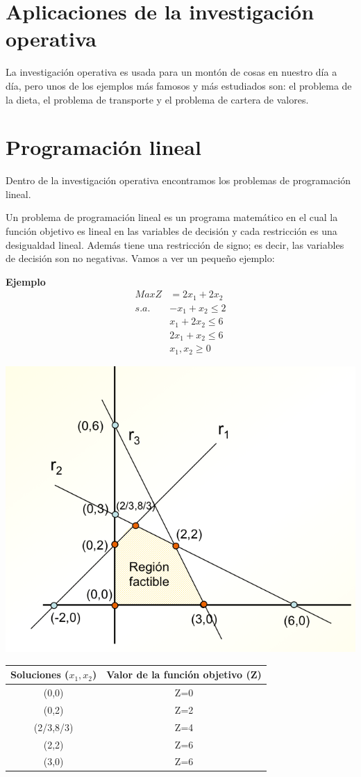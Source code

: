 \documentclass{article}
\begin{document}
\section{Aplicaciones de la investigación operativa}
La investigación operativa es usada para un montón de cosas en nuestro día a día, pero unos de los ejemplos más famosos y más estudiados son: el problema de la dieta, el problema de transporte y el problema de cartera de valores.

\section{Programación lineal}
Dentro de la investigación operativa encontramos los problemas de programación lineal.

Un problema de programación lineal es un programa matemático en el cual la función objetivo es lineal en las variables de decisión y cada restricción es una desigualdad lineal. Además tiene una restricción de signo; es decir, las variables de decisión son no negativas. Vamos a ver un pequeño ejemplo:

\textbf{Ejemplo}
\begin{equation}
\begin{split}
MaxZ&=2x_1+2x_2\\
s.a.~&-x_1+x_2\leq 2\\
&x_1+2x_2\leq 6\\
&2x_1+x_2\leq 6\\
&x_1,x_2\geq 0
\end{split}
\end{equation}
\begin{center}
\includegraphics[width=.70\textwidth]{ej_grafi.png} \\
\end{center}

\begin{center}
\begin{tabular}{ c | c }
Soluciones ($x_1,x_2$)  & Valor de la función objetivo (Z) \\ \hline 
(0,0) & Z=0 \\
(0,2) & Z=2 \\
(2/3,8/3) & Z=4 \\
(2,2) & Z=6 \\
(3,0) & Z=6
\end{tabular}
\end{center}
\end{document}
